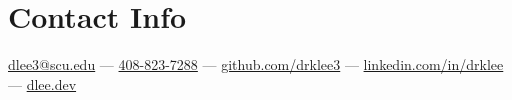 \section{\sc Contact Info}
\href{mailto:dlee3@scu.edu}{dlee3@scu.edu} ---
\href{tel:408-823-7288}{408-823-7288} ---
\href{https://github.com/drklee3}{github.com/drklee3} ---
\href{https://www.linkedin.com/in/drklee/}{linkedin.com/in/drklee} ---
\href{https://dlee.dev}{dlee.dev}


